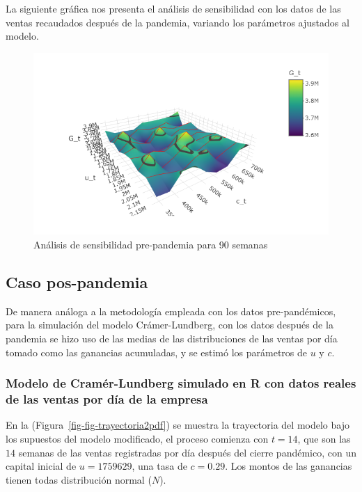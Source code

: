 \documentclass[
  us-letterpaper,
]{scrreprt}
\theoremstyle{plain}
\theoremstyle{plain}
\theoremstyle{definition}
\theoremstyle{remark}
\begin{document}
La siguiente gráfica nos presenta el análisis de sensibilidad con los
datos de las ventas recaudados después de la pandemia, variando los
parámetros ajustados al modelo.

\begin{figure}[H]

{\centering \includegraphics[width=5.20833in,height=\textheight,keepaspectratio]{fig-analisispdf.png}

}

\caption{Análisis de sensibilidad pre-pandemia para 90 semanas}

\end{figure}%

\subsection{Caso pos-pandemia}\label{caso-pos-pandemia}

De manera análoga a la metodología empleada con los datos
pre-pandémicos, para la simulación del modelo Crámer-Lundberg, con los
datos después de la pandemia se hizo uso de las medias de las
distribuciones de las ventas por día tomado como las ganancias
acumuladas, y se estimó los parámetros de \(u\) y \(c\).

\subsubsection{Modelo de Cramér-Lundberg simulado en R con datos reales
de las ventas por día de la
empresa}\label{modelo-de-cramuxe9r-lundberg-simulado-en-r-con-datos-reales-de-las-ventas-por-duxeda-de-la-empresa}

En la (Figura~\ref{fig-fig-trayectoria2pdf}) se muestra la trayectoria
del modelo bajo los supuestos del modelo modificado, el proceso comienza
con \(t = 14\), que son las \(14\) semanas de las ventas registradas por
día después del cierre pandémico, con un capital inicial de
\(u= 1759629\), una tasa de \(c= 0.29\). Los montos de las ganancias
tienen todas distribución normal (\(N\)).
\end{document}
